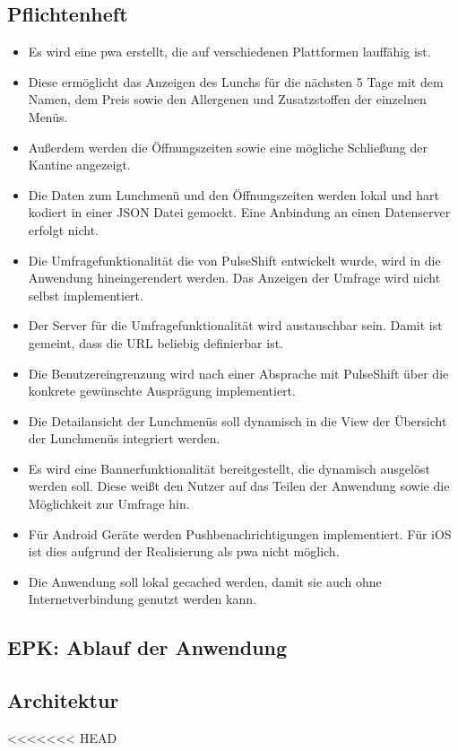 \subsection{Pflichtenheft}

\begin{itemize}
\item Es wird eine \gls{pwa} erstellt, die auf verschiedenen Plattformen lauffähig ist. 
\item Diese ermöglicht das Anzeigen des Lunchs für die nächsten 5 Tage mit dem Namen, dem Preis sowie den Allergenen und Zusatzstoffen der einzelnen Menüs. 
\item Außerdem werden die Öffnungszeiten sowie eine mögliche Schließung der Kantine angezeigt.
\item Die Daten zum Lunchmenü und den Öffnungszeiten werden lokal und hart kodiert in einer JSON Datei gemockt. Eine Anbindung an einen Datenserver erfolgt nicht. 
\item Die Umfragefunktionalität die von PulseShift entwickelt wurde, wird in die Anwendung hineingerendert werden. Das Anzeigen der Umfrage wird nicht selbst implementiert. 
\item Der Server für die Umfragefunktionalität wird austauschbar sein. Damit ist gemeint, dass die URL beliebig definierbar ist.
\item Die Benutzereingrenzung wird nach einer Absprache mit PulseShift über die konkrete gewünschte Ausprägung implementiert.
\item Die Detailansicht der Lunchmenüs soll dynamisch in die View der Übersicht der Lunchmenüs integriert werden.
\item Es wird eine Bannerfunktionalität bereitgestellt, die dynamisch ausgelöst werden soll. Diese weißt den Nutzer auf das Teilen der Anwendung sowie die Möglichkeit zur Umfrage hin.
\item Für Android Geräte werden Pushbenachrichtigungen implementiert. Für iOS ist dies aufgrund der Realisierung als \gls{pwa} nicht möglich.
\item Die Anwendung soll lokal gecached werden, damit sie auch ohne Internetverbindung genutzt werden kann.
\end{itemize}

\subsection{EPK: Ablauf der Anwendung}

\subsection{Architektur}
<<<<<<< HEAD

